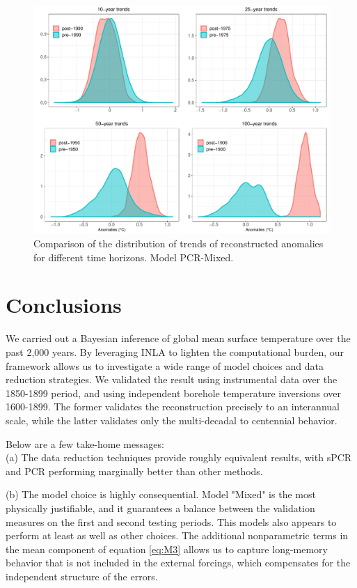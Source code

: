 \documentclass[12pt]{amsart}
\theoremstyle{plain}
\theoremstyle{definition}
\theoremstyle{remark}
\begin{document}
\begin{figure}
  \centering
  \includegraphics[scale=0.35]{compTrends}
  \caption{Comparison of the distribution of trends of reconstructed anomalies for different time horizons. Model PCR-Mixed.}
  \label{fig:comptrends}
\end{figure}

\section{Conclusions}
We carried out a Bayesian inference of global mean surface temperature over
the past 2,000 years. By leveraging INLA to lighten the computational burden, our framework allows us to investigate a wide range of model choices and data reduction strategies.  We validated the result using instrumental data over the 1850-1899 period, and using independent borehole temperature inversions over 1600-1899. The former validates the reconstruction precisely to an interannual scale, while the latter validates only the multi-decadal to centennial behavior.  

Below are a few take-home messages:\\
     (a) The data reduction techniques provide roughly equivalent results, with
      sPCR and PCR performing marginally better than other methods.
    
     \noindent (b) The model choice is highly consequential. Model "Mixed" is the most
      physically justifiable, and it guarantees a balance between the
      validation measures on the first and second testing periods. This models also
      appears to perform at least as well as other choices. The 
      additional nonparametric terms in the mean component of equation \eqref{eq:M3} allows us
      to capture long-memory behavior that is not included in the external forcings, which compensates for the independent structure of the errors. 
      
\end{document}
